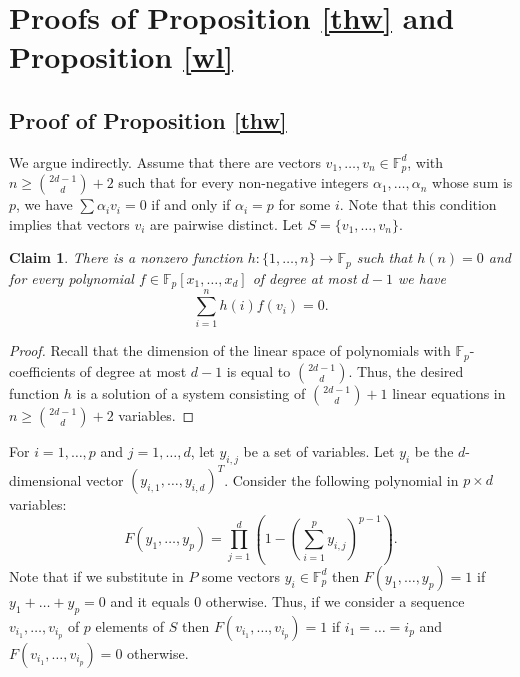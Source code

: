 \documentclass{daj}
\renewcommand{\ge}{\geqslant}
\newcommand{\FF}{\mathbb F}
\newtheorem{claim}[theorem]{Claim}
\theoremstyle{definition}
\theoremstyle{remark}
\theoremstyle{definition}
\theoremstyle{definition}
\begin{document}
\section{Proofs of Proposition \ref{thw} and Proposition \ref{wl}}


\subsection{Proof of Proposition \ref{thw}}\label{theasy2}

We argue indirectly. Assume that there are vectors $v_1, \ldots, v_n \in \FF_p^d$, with $n \ge {2d-1 \choose d}+2$ such that for every non-negative integers $\alpha_1, \ldots, \alpha_n$ whose sum is $p$, we have $\sum \alpha_i v_i = 0$ if and only if $\alpha_i = p$ for some $i$. Note that this condition implies that vectors $v_i$ are pairwise distinct. Let $S = \{v_1, \ldots, v_n\}$.

\begin{claim}\label{h}
There is a nonzero function $h: \{1, \ldots, n\} \rightarrow \FF_p$ such that $h(n) = 0$ and for every polynomial $f \in \FF_p[x_1, \ldots, x_d]$ of degree at most $d-1$ we have
\begin{equation*}
    \sum_{i = 1}^n h(i) f(v_i) = 0.
\end{equation*}
\end{claim}

\begin{proof}
Recall that the dimension of the linear space of polynomials with $\FF_p$-coefficients of degree at most $d-1$ is equal to $2d-1 \choose d$. Thus, the desired function $h$ is a solution of a system consisting of ${2d-1 \choose d} + 1$ linear equations in $n \ge {2d-1 \choose d} + 2$ variables.
\end{proof}

For $i = 1, \ldots, p$ and $j = 1, \ldots, d$, let $y_{i, j}$ be a set of variables. Let $y_i$ be the $d$-dimensional vector $(y_{i, 1}, \ldots, y_{i, d})^T$.
Consider the following polynomial in $p \times d$ variables:
\begin{equation}\label{poly}
    F(y_1, \ldots, y_p) = \prod_{j = 1}^d \left( 1 - \left(\sum_{i = 1}^p y_{i, j}\right)^{p-1}  \right).
\end{equation}
Note that if we substitute in $P$ some vectors $y_i \in \FF_p^d$ then $F(y_1, \ldots, y_p) = 1$ if $y_1 + \ldots + y_p = 0$ and it equals 0 otherwise. Thus, if we consider a sequence $v_{i_1}, \ldots, v_{i_p}$ of $p$ elements of $S$ then $F(v_{i_1}, \ldots, v_{i_p}) =1$ if $i_1 = \ldots = i_p$ and $F(v_{i_1}, \ldots, v_{i_p}) = 0$ otherwise.
\end{document}
